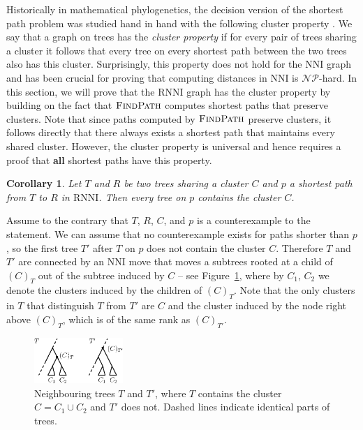 \documentclass[11pt]{amsart}
\newtheorem{corollary}{Corollary}
\newcommand{\rnni}{\mathrm{RNNI}}
\newcommand{\findpath}{\textsc{FindPath}}
\newcommand{\nni}{\mathrm{NNI}}
\newcommand{\np}{\mathcal{NP}}
\newcommand{\summary}[1]{} %
\begin{document}
\summary{Some words on the cluster property}
Historically in mathematical phylogenetics, the decision version of the shortest path problem was studied hand in hand with the following cluster property \autocite{Dasgupta2000-xa}.
We say that a graph on trees has the \emph{cluster property} if for every pair of trees sharing a cluster it follows that every tree on every shortest path between the two trees also has this cluster.
Surprisingly, this property does not hold for the $\nni$ graph \autocite{Li1996-zw} and has been crucial for proving \autocite{Dasgupta2000-xa} that computing distances in $\nni$ is $\np$-hard.
In this section, we will prove that the $\rnni$ graph has the cluster property by building on the fact that $\findpath$ computes shortest paths that preserve clusters.
Note that since paths computed by $\findpath$ preserve clusters, it follows directly that there always exists a shortest path that maintains every shared cluster.
However, the cluster property is universal and hence requires a proof that \textbf{all} shortest paths have this property.

\summary{Proving the Cluster Property for $\rnni$}

\begin{corollary}
Let $T$ and $R$ be two trees sharing a cluster $C$ and $p$ a shortest path from $T$ to $R$ in $\rnni$.
Then every tree on $p$ contains the cluster $C$.
\label{cluster_thm}
\end{corollary}

\proof
Assume to the contrary that $T$, $R$, $C$, and $p$ is a counterexample to the statement.
We can assume that no counterexample exists for paths shorter than $p$, so the first tree $T'$ after $T$ on $p$ does not contain the cluster $C$.
Therefore $T$ and $T'$ are connected by an $\nni$ move that moves a subtrees rooted at a child of $(C)_T$ out of the subtree induced by $C$ -- see Figure~\ref{fig:cluster_thm_proof}, where by $C_1$, $C_2$ we denote the clusters induced by the children of $(C)_T$.
Note that the only clusters in $T$ that distinguish $T$ from $T'$ are $C$ and the cluster induced by the node right above $(C)_{T}$, which is of the same rank as $(C)_{T'}$.

\begin{figure}[ht]
\centering
\includegraphics[width=0.3\textwidth]{cluster_thm_proof}
\caption{Neighbouring trees $T$ and $T'$, where $T$ contains the cluster $C = C_1 \cup C_2$ and $T'$ does not.
Dashed lines indicate identical parts of trees.}
\label{fig:cluster_thm_proof}
\end{figure}
\end{document}
